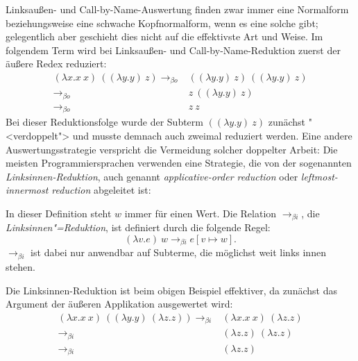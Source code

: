 Linksaußen- und Call-by-Name-Auswertung finden zwar immer eine
Normalform beziehungsweise eine schwache Kopfnormalform, wenn es eine solche
gibt; gelegentlich aber geschieht dies nicht auf die effektivste Art
und Weise.  Im folgendem Term wird bei Linksaußen- und
Call-by-Name-Reduktion zuerst der äußere Redex reduziert:
%
\begin{displaymath}
  \begin{array}{rl}
  (\lambda x.x~x)~((\lambda y.y)~z)
  \rightarrow_{\beta o} & 
  ((\lambda y.y)~z)~((\lambda y.y)~z)
  \\
  \rightarrow_{\beta o} & 
  z~((\lambda y.y)~z)
  \\
  \rightarrow_{\beta o} & 
  z~z
\end{array}
\end{displaymath}
%
Bei dieser Reduktionsfolge wurde der Subterm $((\lambda y.y)~z)$
zunächst "<verdoppelt"> und musste demnach auch zweimal reduziert
werden.  Eine andere Auswertungsstrategie verspricht die Vermeidung
solcher doppelter Arbeit:  Die meisten Programmiersprachen verwenden
eine Strategie, die von der sogenannten \textit{Linksinnen-Reduktion},
auch genannt \emph{applicative-order reduction} oder
\emph{leftmost-innermost reduction} abgeleitet ist:
%
\begin{definition}
  In dieser Definition steht $w$ immer für einen Wert.
  Die Relation $\rightarrow_{\beta i}$, die
  \textit{Linksinnen"=Reduktion}, ist definiert durch die
  folgende Regel:
  \begin{displaymath}
    (\lambda v.e)~w \rightarrow_{\beta i} e[v \mapsto w].
  \end{displaymath}
  $\rightarrow_{\beta i}$ ist dabei nur anwendbar auf Subterme, die
  möglichst weit links innen stehen.
\end{definition}
%
Die Linksinnen-Reduktion ist beim obigen Beispiel effektiver, da
zunächst das Argument der äußeren Applikation ausgewertet wird:
%
\begin{displaymath}
  \begin{array}{rl}
  (\lambda x.x~x)~((\lambda y.y)~(\lambda z.z))
  \rightarrow_{\beta i} & 
  (\lambda x.x~x)~(\lambda z.z)
  \\
  \rightarrow_{\beta i} & 
  (\lambda z.z)~(\lambda z.z)
  \\
  \rightarrow_{\beta i} & 
  (\lambda z.z)
\end{array}
\end{displaymath}
